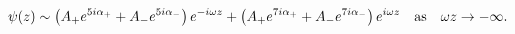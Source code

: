 \begin{equation}
\psi(z) \sim \left(A_+ e^{5 i \alpha_+} + A_- e^{5 i \alpha_-} \right) 
e^{-i \omega z} + \left(A_+ e^{7 i \alpha_+} + A_- e^{7 i \alpha_-} \right) e^{i \omega z} \textrm{\quad as\quad} 
\omega z \to -\infty. \end{equation}

